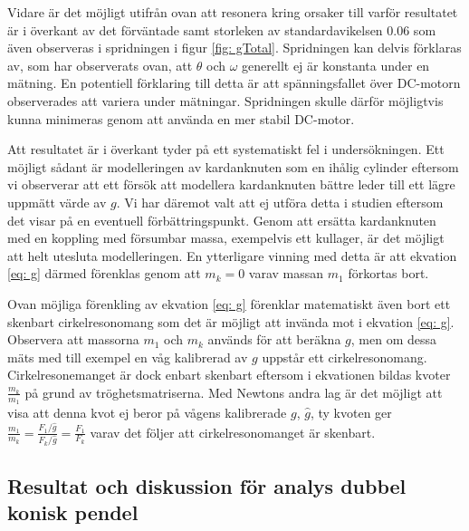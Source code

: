 \documentclass[12pt,a4paper]{article}
\begin{document}
Vidare är det möjligt utifrån ovan att resonera kring orsaker till varför resultatet är i överkant av det förväntade samt storleken av standardavikelsen 0.06 som även observeras i spridningen i figur \ref{fig: gTotal}. Spridningen kan delvis förklaras av, som har observerats ovan, att $\theta$ och $\omega$ generellt ej är konstanta under en mätning. En potentiell förklaring till detta är att spänningsfallet över DC-motorn observerades att variera under mätningar. Spridningen skulle därför möjligtvis kunna minimeras genom att använda en mer stabil DC-motor.

Att resultatet är i överkant tyder på ett systematiskt fel i undersökningen. Ett möjligt sådant är modelleringen av kardanknuten som en ihålig cylinder eftersom vi observerar att ett försök att modellera kardanknuten bättre leder till ett lägre uppmätt värde av $g$. Vi har däremot valt att ej utföra detta i studien eftersom det visar på en eventuell förbättringspunkt. Genom att ersätta kardanknuten med en koppling med försumbar massa, exempelvis ett kullager, är det möjligt att helt utesluta modelleringen. En ytterligare vinning med detta är att ekvation \eqref{eq: g} därmed förenklas genom att $m_k = 0$ varav massan $m_1$ förkortas bort.

Ovan möjliga förenkling av ekvation \eqref{eq: g} förenklar matematiskt även bort ett skenbart cirkelresonomang som det är möjligt att invända mot i ekvation \eqref{eq: g}. Observera att massorna $m_1$ och $m_k$ används för att beräkna $g$, men om dessa mäts med till exempel en våg kalibrerad av $g$ uppstår ett cirkelresonomang. Cirkelresonemanget är dock enbart skenbart eftersom i ekvationen bildas kvoter $\frac{m_k}{m_1}$ på grund av tröghetsmatriserna. Med Newtons andra lag är det möjligt att visa att denna kvot ej beror på vågens kalibrerade $g$, $\hat{g}$, ty kvoten ger $\frac{m_1}{m_k} = \frac{F_1/\hat{g}}{F_k/\hat{g}} = \frac{F_1}{F_k}$ varav det följer att cirkelresonomanget är skenbart.

\subsection{Resultat och diskussion för analys dubbel konisk pendel}
\end{document}
